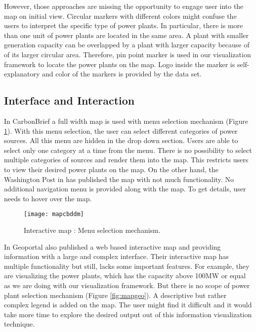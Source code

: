 However, those approaches are missing the opportunity to engage user into the map on initial view. Circular markers with different colors might confuse the users to interpret the specific type of power plants. In particular, there is more than one unit of power plants are located in the same area. A plant with smaller generation capacity can be overlapped by a plant with larger capacity because of of its larger circular area. Therefore, pin point marker is used in our visualization framework to locate the power plants on the map. Logo inside the marker is self-explanatory and color of the markers is provided by the data set.
 
\subsection*{Interface and Interaction}

In CarbonBrief \cite{cbg2016} a full width map is used with menu selection mechanism (Figure \ref{fig:mapcbm}). With this menu selection, the user can select different categories of power sources. All this menu are hidden in the drop down section. Users are able to select only one category at a time from the menu. There is no possibility to select multiple categories of sources and render them into the map. This restricts users to view their desired power plants on the map. On the other hand, the Washington Post in \cite{wp2015} has published the map with not much functionality. No additional navigation menu is provided along with the map. To get details, user needs to hover over the map.

\begin{figure}
  \begin{center}
    \texttt{[image: mapcbddm]}
    \caption{Interactive map : Menu selection mechanism.}
    \label{fig:mapcbm}
  \end{center}
\end{figure}

In Geoportal \cite{gportal2016} also published a web based interactive map and providing information with a large and complex interface. Their interactive map has multiple functionality but still, lacks some important features.  For example, they are visualizing the power plants, which has the capacity above 100MW or equal as we are doing with our visualization framework. But there is no scope of power plant selection mechanism (Figure \ref{fig:mapgeo}).   
A descriptive but rather complex legend is added on the map. The user might find it difficult and it would take more time to explore the desired output out of this information visualization technique.

